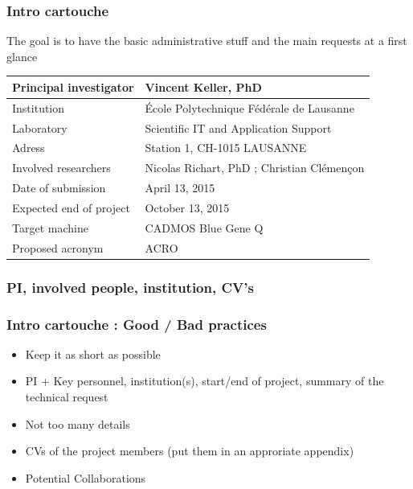 \begin{frame}[containsverbatim]
	\frametitle{Intro cartouche}

The goal is to have the basic administrative stuff and the main requests at a first glance

\begin{center}
\begin{tabular}{| l | l |}
	\hline
	Principal investigator & Vincent Keller, PhD \\
	\hline
	Institution & \'Ecole Polytechnique F\'ed\'erale de Lausanne \\
	\hline
	Laboratory & Scientific IT and Application Support \\
	\hline
	Adress & Station 1, CH-1015 LAUSANNE \\
	\hline
	Involved researchers & Nicolas Richart, PhD ; Christian Cl\'emen\c{c}on \\
	\hline
	Date of submission & April 13, 2015 \\
	\hline
	Expected end of project & October 13, 2015 \\
	\hline
	Target machine & CADMOS Blue Gene Q \\
	\hline
	Proposed acronym & ACRO \\
	\hline
\end{tabular}
\end{center}
\end{frame}


\subsubsection{PI, involved people, institution, CV's}


\begin{frame}[containsverbatim]
	\frametitle{Intro cartouche : Good / Bad practices}

\begin{itemize}
	\item{\textcolor{dkgreen}{Keep it as short as possible}}
	\item{\textcolor{dkgreen}{PI + Key personnel, institution(s), start/end of project, summary of the technical request}}
	\item{\textcolor{dkred}{Not too many details}}
	\item{\textcolor{dkred}{CVs of the project members (put them in an approriate appendix)}}
	\item{\textcolor{dkred}{Potential Collaborations}}
\end{itemize}
\end{frame}



